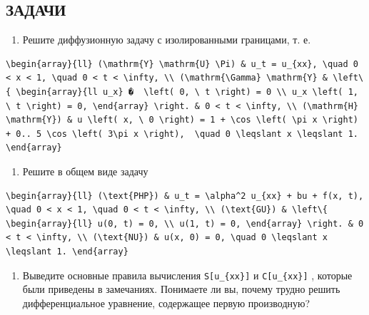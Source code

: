 \documentclass[
  ukrainian,
]{article}
\providecommand{\tightlist}{%
  \setlength{\itemsep}{0pt}\setlength{\parskip}{0pt}}
\begin{document}
\subsection{ЗАДАЧИ}\label{ux437ux430ux434ux430ux447ux438}

\begin{enumerate}
\def\labelenumi{\arabic{enumi}.}
\tightlist
\item
  Решите диффузионную задачу с изолированными границами, т. е.
\end{enumerate}

\begin{verbatim}
\begin{array}{ll} (\mathrm{Y} \mathrm{U} \Pi) & u_t = u_{xx}, \quad 0 < x < 1, \quad 0 < t < \infty, \\ (\mathrm{\Gamma} \mathrm{Y} & \left\{ \begin{array}{ll u_x} �  \left( 0, \ t \right) = 0 \\ u_x \left( 1, \ t \right) = 0, \end{array} \right. & 0 < t < \infty, \\ (\mathrm{H} \mathrm{Y}) & u \left( x, \ 0 \right) = 1 + \cos \left( \pi x \right) + 0.. 5 \cos \left( 3\pi x \right),  \quad 0 \leqslant x \leqslant 1. \end{array}
\end{verbatim}

\begin{enumerate}
\def\labelenumi{\arabic{enumi}.}
\setcounter{enumi}{1}
\tightlist
\item
  Решите в общем виде задачу
\end{enumerate}

\begin{verbatim}
\begin{array}{ll} (\text{PHP}) & u_t = \alpha^2 u_{xx} + bu + f(x, t), \quad 0 < x < 1, \quad 0 < t < \infty, \\ (\text{GU}) & \left\{ \begin{array}{ll} u(0, t) = 0, \\ u(1, t) = 0, \end{array} \right. & 0 < t < \infty, \\ (\text{NU}) & u(x, 0) = 0, \quad 0 \leqslant x \leqslant 1. \end{array}
\end{verbatim}

\begin{enumerate}
\def\labelenumi{\arabic{enumi}.}
\setcounter{enumi}{2}
\tightlist
\item
  Выведите основные правила вычисления \texttt{S{[}u\_\{xx\}{]}} и
  \texttt{C{[}u\_\{xx\}{]}} , которые были приведены в замечаниях.
  Понимаете ли вы, почему трудно решить дифференциальное уравнение,
  содержащее первую производную?
\end{enumerate}
\end{document}
